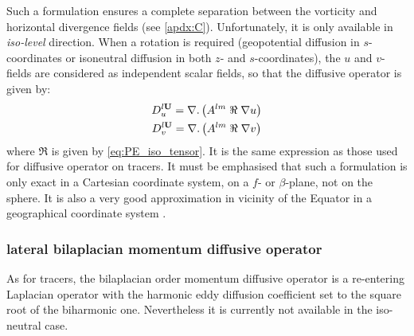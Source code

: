 \documentclass[../main/NEMO_manual]{subfiles}
\begin{document}
Such a formulation ensures a complete separation between the vorticity and horizontal divergence fields
(see \autoref{apdx:C}).
Unfortunately, it is only available in \textit{iso-level} direction.
When a rotation is required
(\ie geopotential diffusion in $s$-coordinates or isoneutral diffusion in both $z$- and $s$-coordinates),
the $u$ and $v$-fields are considered as independent scalar fields, so that the diffusive operator is given by:
\begin{gather*}
    D_u^{l \mathbf{U}} = \nabla . \left( A^{lm} \; \Re \; \nabla u \right) \\
    D_v^{l \mathbf{U}} = \nabla . \left( A^{lm} \; \Re \; \nabla v \right)
\end{gather*}
where $\Re$ is given by \autoref{eq:PE_iso_tensor}.
It is the same expression as those used for diffusive operator on tracers.
It must be emphasised that such a formulation is only exact in a Cartesian coordinate system,
\ie on a $f$- or $\beta$-plane, not on the sphere.
It is also a very good approximation in vicinity of the Equator in
a geographical coordinate system \citep{Lengaigne_al_JGR03}.

\subsubsection{lateral bilaplacian momentum diffusive operator}

As for tracers, the bilaplacian order momentum diffusive operator is a re-entering Laplacian operator with
the harmonic eddy diffusion coefficient set to the square root of the biharmonic one.
Nevertheless it is currently not available in the iso-neutral case.

\biblio

\pindex
\end{document}
